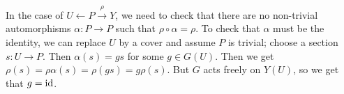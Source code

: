 \begin{example}
   In the case of $U\leftarrow P\xrightarrow\rho Y$, we need to check that there are no
   non-trivial automorphisms $\alpha:P\to P$ such that $\rho\circ \alpha=\rho$. To check
   that $\alpha$ must be the identity, we can replace $U$ by a cover and assume $P$ is
   trivial; choose a section $s:U\to P$. Then $\alpha(s)=gs$ for some $g\in G(U)$. Then we
   get $\rho(s)=\rho\alpha(s)=\rho(gs)=g\rho(s)$. But $G$ acts freely on $Y(U)$, so we get
   that $g=\operatorname{id}$.
 \end{example}
